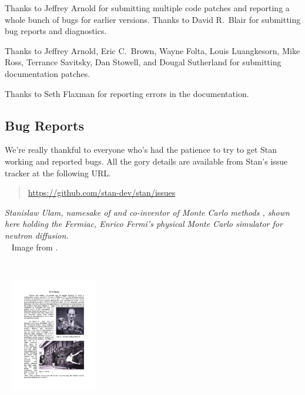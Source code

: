 Thanks to Jeffrey Arnold for submitting multiple code patches and
reporting a whole bunch of bugs for earlier versions.  Thanks to David
R.~Blair for submitting bug reports and diagnostics.

Thanks to Jeffrey Arnold, Eric C.~Brown, Wayne Folta, Louis
Luangkesorn, Mike Ross, Terrance Savitsky, Dan Stowell, and Dougal
Sutherland for submitting documentation patches.

Thanks to Seth Flaxman for reporting errors in the documentation.


\subsection*{Bug Reports}

We're really thankful to everyone who's had the patience to try
to get Stan working and reported bugs.  All the gory details are
available from Stan's issue tracker at the following URL.
%
\begin{quote}
\url{https://github.com/stan-dev/stan/issues}
\end{quote}




\vfill
\begin{center}
\hfill
\begin{minipage}[b]{2in}
  \footnotesize {\it Stanislaw Ulam, namesake of \Stan and co-inventor
    of Monte Carlo methods \citep{MetropolisUlam:1949}, shown here
    holding the Fermiac, Enrico Fermi's physical Monte Carlo simulator
    for neutron diffusion.}
  \\[3pt] \mbox{ } \hfill
  {\scriptsize Image from \citep{Giesler:2000}.}
\end{minipage} \ \ \ \ \ 
\begin{minipage}[b]{1.5in} \mbox{ } \hfill
  \includegraphics[width=1.5in]{../../../logos/ulam-fermiac.pdf}
\end{minipage} 
\end{center}
